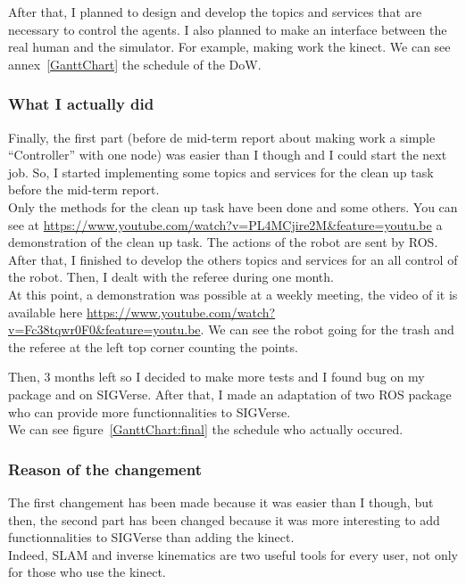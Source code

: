 After that, I planned to design and develop the topics and services that are necessary to control the agents. I also planned to make an interface between the real human and the simulator. For example, making work the kinect. We can see annex~\ref{GanttChart} the schedule of the DoW.

\subsubsection{What I actually did}
Finally, the first part (before de mid-term report about making work a simple ``Controller'' with one node) was easier than I though and I could start the next job. So, I started implementing some topics and services for the clean up task before the mid-term report.\\
Only the methods for the clean up task have been done and some others. You can see at \url{https://www.youtube.com/watch?v=PL4MCjire2M&feature=youtu.be} a demonstration of the clean up task. The actions of the robot are sent by ROS.\\

After that, I finished to develop the others topics and services for an all control of the robot. Then, I dealt with the referee during one month.\\
At this point, a demonstration was possible at a weekly meeting, the video of it is available here \url{https://www.youtube.com/watch?v=Fc38tqwr0F0&feature=youtu.be}. We can see the robot going for the trash and the referee at the left top corner counting the points.

Then, 3 months left so I decided to make more tests and I found bug on my package and on SIGVerse. After that, I made an adaptation of two ROS package who can provide more functionnalities to SIGVerse.\\
We can see figure~\ref{GanttChart:final} the schedule who actually occured.

\subsubsection{Reason of the changement}
The first changement has been made because it was easier than I though, but then, the second part has been changed because it was more interesting to add functionnalities to SIGVerse than adding the kinect.\\
Indeed, SLAM and inverse kinematics are two useful tools for every user, not only for those who use the kinect.

